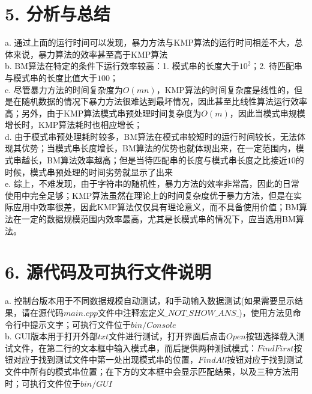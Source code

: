 \documentclass{article}
\begin{document}
  \section*{5. 分析与总结}
  a. 通过上面的运行时间可以发现，暴力方法与KMP算法的运行时间相差不大，总体来说，暴力算法的效率甚至高于KMP算法\\
  b. BM算法在特定的条件下运行效率较高：1. 模式串的长度大于$10^2$；2. 待匹配串与模式串的长度比值大于$100$；\\
  c. 尽管暴力方法的时间复杂度为$O(mn)$，KMP算法的时间复杂度是线性的，但是在随机数据的情况下暴力方法很难达到最坏情况，因此甚至比线性算法运行效率高；另外，由于KMP算法模式串预处理时间复杂度为$O(m)$，因此当模式串规模增长时，KMP算法耗时也相应增长；\\
  d. 由于模式串预处理耗时较多，BM算法在模式串较短时的运行时间较长，无法体现其优势；当模式串长度增长，BM算法的优势也就体现出来，在一定范围内，模式串越长，BM算法效率越高；但是当待匹配串的长度与模式串长度之比接近$10$的时候，模式串预处理的时间劣势就显示了出来\\
  e. 综上，不难发现，由于字符串的随机性，暴力方法的效率非常高，因此的日常使用中完全足够；KMP算法虽然在理论上的时间复杂度优于暴力方法，但是在实际应用中效率很差，因此KMP算法仅仅具有理论意义，而不具备使用价值；BM算法在一定的数据规模范围内效率最高，尤其是长模式串的情况下，应当选用BM算法。
  \section*{6. 源代码及可执行文件说明}
  a. 控制台版本用于不同数据规模自动测试，和手动输入数据测试(如果需要显示结果，请在源代码$main.cpp$文件中注释宏定义$\_NOT\_SHOW\_ANS\_$)，使用方法见命令行中提示文字；可执行文件位于$bin/Console$\\
  b. GUI版本用于打开外部$txt$文件进行测试，打开界面后点击$Open$按钮选择载入测试文件，在第二行的文本框中输入模式串，而后提供两种测试模式：$Find First$按钮对应于找到测试文件中第一处出现模式串的位置，$Find All$按钮对应于找到测试文件中所有的模式串位置；在下方的文本框中会显示匹配结果，以及三种方法用时；可执行文件位于$bin/GUI$
\end{document}

